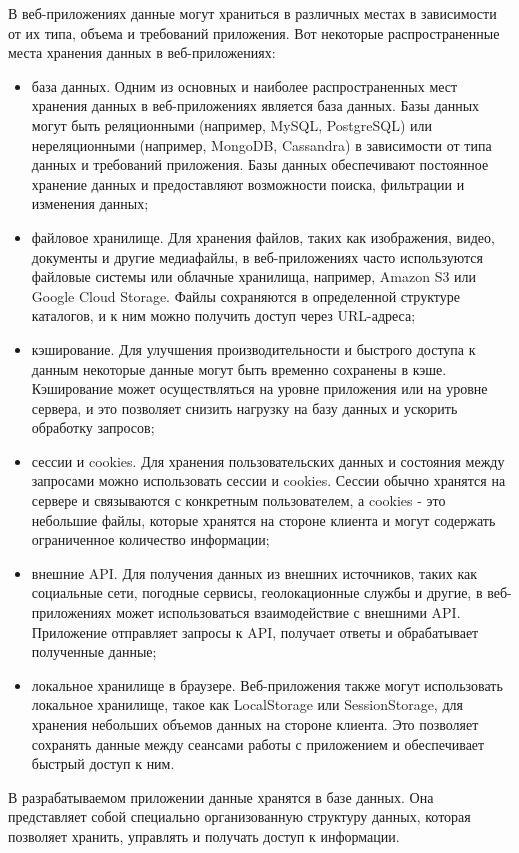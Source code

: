В веб-приложениях данные могут храниться в различных местах в зависимости от их типа, объема и требований приложения. Вот некоторые распространенные места хранения данных в веб-приложениях:
\begin{itemize}
    \item база данных. Одним из основных и наиболее распространенных мест хранения данных в веб-приложениях является база данных. Базы данных могут быть реляционными (например, MySQL, PostgreSQL) или нереляционными (например, MongoDB, Cassandra) в зависимости от типа данных и требований приложения. Базы данных обеспечивают постоянное хранение данных и предоставляют возможности поиска, фильтрации и изменения данных;
    \item файловое хранилище. Для хранения файлов, таких как изображения, видео, документы и другие медиафайлы, в веб-приложениях часто используются файловые системы или облачные хранилища, например, Amazon S3 или Google Cloud Storage. Файлы сохраняются в определенной структуре каталогов, и к ним можно получить доступ через URL-адреса;
    \item кэширование. Для улучшения производительности и быстрого доступа к данным некоторые данные могут быть временно сохранены в кэше. Кэширование может осуществляться на уровне приложения или на уровне сервера, и это позволяет снизить нагрузку на базу данных и ускорить обработку запросов;
    \item сессии и cookies. Для хранения пользовательских данных и состояния между запросами можно использовать сессии и cookies. Сессии обычно хранятся на сервере и связываются с конкретным пользователем, а cookies - это небольшие файлы, которые хранятся на стороне клиента и могут содержать ограниченное количество информации;
    \item внешние API. Для получения данных из внешних источников, таких как социальные сети, погодные сервисы, геолокационные службы и другие, в веб-приложениях может использоваться взаимодействие с внешними API. Приложение отправляет запросы к API, получает ответы и обрабатывает полученные данные;
    \item локальное хранилище в браузере. Веб-приложения также могут использовать локальное хранилище, такое как LocalStorage или SessionStorage, для хранения небольших объемов данных на стороне клиента. Это позволяет сохранять данные между сеансами работы с приложением и обеспечивает быстрый доступ к ним.
\end{itemize}

В разрабатываемом приложении данные хранятся в базе данных. Она представляет собой специально организованную структуру данных, которая позволяет хранить, управлять и получать доступ к информации.

